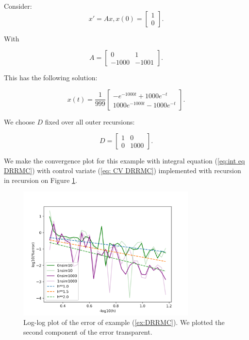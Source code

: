 \documentclass[a4paper,12pt]{article}
\begin{document}
\begin{example}[DRRMC] \label{ex:DRRMC}
    Consider:
    \begin{equation}
        x'= Ax, x(0)=
        \begin{bmatrix}
            1 \\
            0
        \end{bmatrix}.
    \end{equation}

    With

    \begin{equation}
        A = \begin{bmatrix}
            0     & 1     \\
            -1000 & -1001
        \end{bmatrix}.
    \end{equation}

    This has the following solution:

    \begin{equation}
        x(t) = \frac{1}{999}
        \begin{bmatrix}
            -  e^{-1000t}+ 1000 e^{-t} \\
            1000 e^{-1000t}- 1000e^{-t}
        \end{bmatrix}.
    \end{equation}

    We choose $D$ fixed over all outer recursions:

    \begin{equation}
        D = \begin{bmatrix}
            1 & 0    \\
            0 & 1000
        \end{bmatrix}.
    \end{equation}

    We make the convergence plot for this example with
    integral equation  (\ref{eq:int eq DRRMC}) with control variate
    (\ref{eq: CV DRRMC}) implemented with recursion in recursion
    on Figure \ref{fig:DRRMC}.

    \begin{figure}[h!]
        \centering
        \includegraphics[width=0.8\textwidth]{plots/DRRMC.png}
        \caption{Log-log plot of the error of example (\ref{ex:DRRMC}).
            We plotted the second component of the error transparent.
        }
        \label{fig:DRRMC}
    \end{figure}


\end{example}
\end{document}
